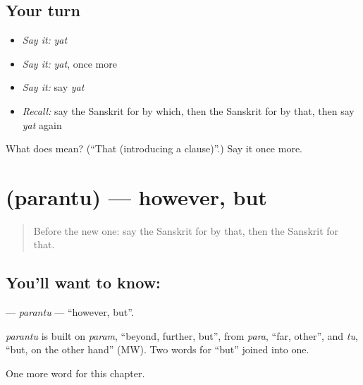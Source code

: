 \subsection*{Your turn}
\begin{itemize}
\raggedright
  \item \emph{Say it:} \emph{yat}
  \item \emph{Say it:} \emph{yat}, once more
  \item \emph{Say it:} say \emph{yat}
  \item \emph{Recall:} say the Sanskrit for by which, then the Sanskrit for by that, then say \emph{yat} again
\end{itemize}

\begin{tcolorbox}[breakable,colback=teal!4,colframe=teal!35!black,title={Before you move on}]
What does  mean? (\textquotedblleft{}That (introducing a clause)\textquotedblright{}.) Say it once more.
\end{tcolorbox}
\section[\texorpdfstring{\sk{परन्तु} (parantu)}{परन्तु (parantu)}]{ (parantu) — however, but}

\label{lesson:SA-C241-parantu}



\begin{quote}
Before the new one: say the Sanskrit for by that, then the Sanskrit for that.
\end{quote}

\subsection*{You'll want to know: }
\textbf{} — \emph{parantu} — \textquotedblleft{}however, but\textquotedblright{}.

\begin{cousinweb}
\emph{parantu} is built on \emph{param}, \textquotedblleft{}beyond, further, but\textquotedblright{}, from \emph{para}, \textquotedblleft{}far, other\textquotedblright{}, and \emph{tu}, \textquotedblleft{}but, on the other hand\textquotedblright{} (MW). Two words for \textquotedblleft{}but\textquotedblright{} joined into one.
\end{cousinweb}

\begin{grammarlens}[title={What you've built}]
One more word for this chapter.
\end{grammarlens}

